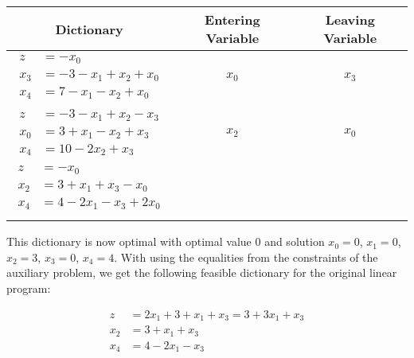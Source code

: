 \documentclass[a4paper,12pt,headsepline]{scrartcl}
\begin{document}
\begin{enumerate}[a)]
    \begin{center}
      \begin{tabular}{ccc}
        Dictionary & Entering Variable & Leaving Variable \\
        \hline
        \hline
      {$\begin{aligned}
        z &= -x_0 \\
        x_3 &= -3 -x_1 +x_2 +x_0 \\
        x_4 &= 7 -x_1 -x_2 +x_0
      \end{aligned}$} & $x_0$ & $x_3$ \\
      \hline
      {$\begin{aligned}
        z &= -3 -x_1 +x_2 -x_3 \\
        x_0 &= 3 +x_1 -x_2 +x_3 \\
        x_4 &= 10 -2x_2 +x_3
      \end{aligned}$} & $x_2$ & $x_0$ \\
      \hline
      {$\begin{aligned}
        z &= -x_0 \\
        x_2 &= 3 +x_1 +x_3 -x_0 \\
        x_4 &= 4 -2x_1 -x_3 +2x_0 \\
      \end{aligned}$} & 
      \end{tabular}
    \end{center}

    This dictionary is now optimal with optimal value 0 and solution $x_0=0$, $x_1=0$, $x_2=3$, $x_3=0$, $x_4=4$.
    With using the equalities from the constraints of the auxiliary problem, we get the following feasible dictionary for the original linear program:

    \begin{align*}
      z &= 2x_1 +3 +x_1 +x_3 = 3 +3x_1 +x_3 \\
      x_2 &= 3 +x_1 +x_3 \\
      x_4 &= 4 -2x_1 -x_3
    \end{align*}


\end{enumerate}
\end{document}
